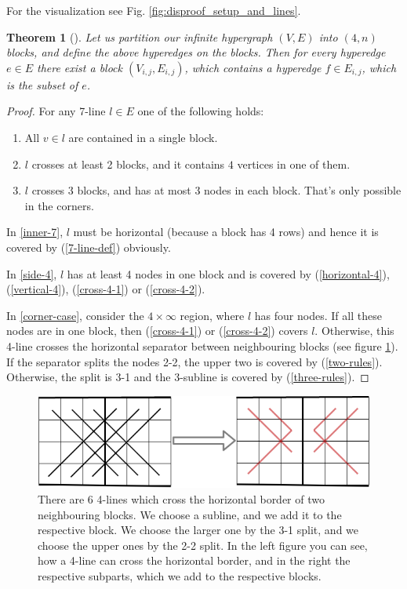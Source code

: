 \documentclass[conference]{IEEEtran}
\newtheorem{theorem}{Theorem}[section]
\theoremstyle{definition}
\begin{document}
For the visualization see Fig. \ref{fig:disproof_setup_and_lines}.
\begin{theorem}[]
\label{thm:reduction_4k}
Let us partition our infinite hypergraph $(V,E)$ into $(4,n)$ blocks, and define the above hyperedges on the blocks.
Then for every hyperedge $e\in E$ there exist a block $(V_{i,j},E_{i,j})$, which contains a hyperedge $f\in E_{i,j}$, which is the subset of $e$. 
\end{theorem}

\begin{proof}
For any 7-line $l \in E$ one of the following holds:
\begin{enumerate}[label=\textbf{C.\arabic*}]
    \item All $v \in l$ are contained in a single block. \label{inner-7}
    \item $l$ crosses at least 2 blocks,  and it contains $4$ vertices in one of them. \label{side-4}
    \item $l$ crosses 3 blocks, and has at most 3 nodes in each block. That's only possible in the corners. \label{corner-case}
\end{enumerate}

\noindent In \ref{inner-7}, $l$ must be horizontal (because a block has 4 rows) and hence it is covered by (\ref{7-line-def}) obviously.

\noindent In \ref{side-4}, $l$ has at least 4 nodes in one block and is covered by (\ref{horizontal-4}), (\ref{vertical-4}), (\ref{cross-4-1}) or (\ref{cross-4-2}).

\noindent In \ref{corner-case}, consider the $4 \times \infty$ region, where $l$ has four nodes. If all these nodes are in one block, then (\ref{cross-4-1}) or (\ref{cross-4-2}) covers $l$. Otherwise, this 4-line crosses the horizontal separator between neighbouring blocks (see figure \ref{fig:corner_lines}). If the separator splits the nodes 2-2, the upper two is covered by (\ref{two-rules}). Otherwise, the split is 3-1 and the 3-subline is covered by (\ref{three-rules}).
\end{proof}

\begin{figure}
    \centering
    \includegraphics[scale=0.4]{figures/corner_lines.png}
    \caption{There are 6 4-lines which cross the horizontal border of two neighbouring blocks. We choose a subline, and we add it to the respective block. We choose the larger one by the 3-1 split, and we choose the upper ones by the 2-2 split. In the left figure you can see, how a 4-line can cross the horizontal border, and in the right the respective subparts, which we add to the respective blocks.}
    \label{fig:corner_lines}
    \vspace{-10pt}
\end{figure}
\end{document}
